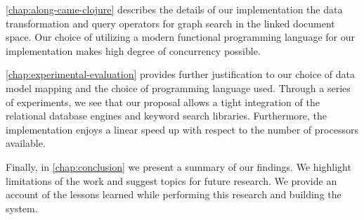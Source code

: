 		\cref{chap:along-came-clojure} describes the details of our implementation the data transformation and query operators for graph search in the linked document space.  Our choice of utilizing a modern functional programming language for our implementation makes high degree of concurrency possible.
		
		\cref{chap:experimental-evaluation} provides further justification to our choice of data model mapping and the choice of programming language used.  Through a series of experiments, we see that our proposal allows a tight integration of the relational database engines and keyword search libraries.  Furthermore, the implementation enjoys a linear speed up with respect to the number of processors available.
		
		Finally, in \cref{chap:conclusion} we present a summary of our findings.  We highlight limitations of the work and suggest topics for future research.  We provide an account of the lessons learned while performing this research and building the system.